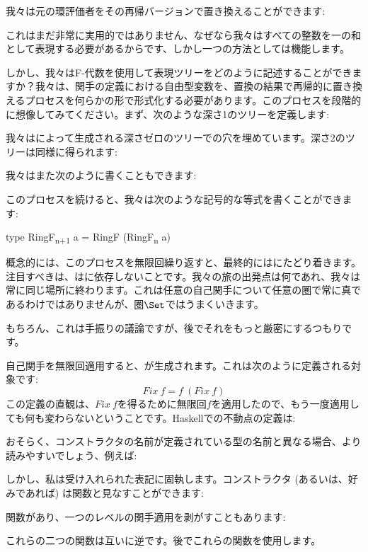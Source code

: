 我々は元の環評価者をその再帰バージョンで置き換えることができます: 

これはまだ非常に実用的ではありません、なぜなら我々はすべての整数を一の和として表現する必要があるからです、しかし一つの方法としては機能します。

しかし、我々はF-代数を使用して表現ツリーをどのように記述することができますか？我々は、関手の定義における自由型変数を、置換の結果で再帰的に置き換えるプロセスを何らかの形で形式化する必要があります。このプロセスを段階的に想像してみてください。まず、次のような深さ1のツリーを定義します: 

我々はによって生成される深さゼロのツリーでの穴を埋めています。深さ2のツリーは同様に得られます: 

我々はまた次のように書くこともできます: 

このプロセスを続けると、我々は次のような記号的な等式を書くことができます: 

\begin{snipv}
type RingF\textsubscript{n+1} a = RingF (RingF\textsubscript{n} a)
\end{snipv}
概念的には、このプロセスを無限回繰り返すと、最終的にはにたどり着きます。注目すべきは、はに依存しないことです。我々の旅の出発点は何であれ、我々は常に同じ場所に終わります。これは任意の自己関手について任意の圏で常に真であるわけではありませんが、圏$\Set$ではうまくいきます。

もちろん、これは手振りの議論ですが、後でそれをもっと厳密にするつもりです。

自己関手を無限回適用すると、が生成されます。これは次のように定義される対象です: 
\[\mathit{Fix}\ f = f\ (\mathit{Fix}\ f)\]
この定義の直観は、$\mathit{Fix}\ f$を得るために無限回$f$を適用したので、もう一度適用しても何も変わらないということです。Haskellでの不動点の定義は: 

おそらく、コンストラクタの名前が定義されている型の名前と異なる場合、より読みやすいでしょう、例えば: 

しかし、私は受け入れられた表記に固執します。コンストラクタ (あるいは、好みであれば) は関数と見なすことができます: 

関数があり、一つのレベルの関手適用を剥がすこともあります: 

これらの二つの関数は互いに逆です。後でこれらの関数を使用します。

